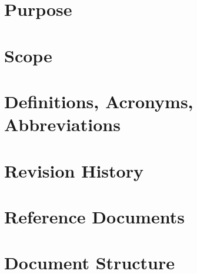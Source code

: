\section{Purpose}

\section{Scope}

\section{Definitions, Acronyms, Abbreviations}

\section{Revision History}

\section{Reference Documents}

\section{Document Structure}
